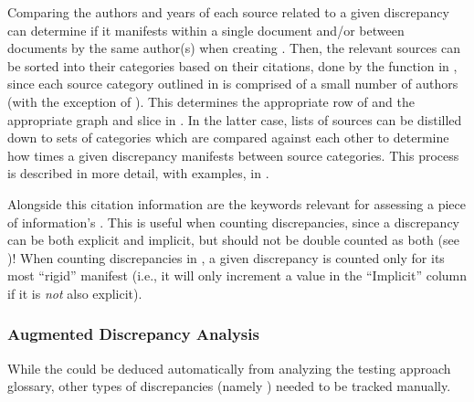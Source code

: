 Comparing the authors and years of each source related to a given discrepancy
can determine if it manifests within a single document and/or between documents
by the same author(s) when creating . Then, the
relevant sources can be sorted into their categories based on their citations,
done by the function in , since each source category
outlined in  is comprised of a small number of authors (with the
exception of ).
This determines the appropriate row of  and the appropriate
graph and slice in . In the latter case, lists of
sources can be distilled down to sets of categories which are compared against
each other to determine how times a given discrepancy manifests between source
categories. This process is described in more detail, with examples, in
.

Alongside this citation information are the keywords relevant for assessing a
piece of information's . This is useful when counting
discrepancies, since a discrepancy can be both explicit and implicit, but
should not be double counted as both (see )! When counting
discrepancies in , a given discrepancy is counted only for
its most ``rigid'' manifest (i.e., it will only increment a value in the
``Implicit'' column if it is \emph{not} also explicit).


\subsubsection{Augmented Discrepancy Analysis}
\label{aug-discrep-analysis}
While the \autoDiscreps{} could be deduced automatically from analyzing the
testing approach glossary, other types of discrepancies (namely
) needed to be tracked manually.
